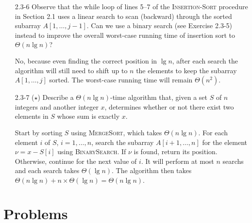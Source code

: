 \begin{enumerate}
\item[2.3{-}6]{Observe that the while loop of lines 5{--}7 of the
\textsc{Insertion-Sort} procedure in Section 2.1 uses a linear search to scan
(backward) through the sorted subarray $A[1, \dots, j - 1]$. Can we use a binary
search (see Exercise 2.3-5) instead to improve the overall worst-case running
time of insertion sort to $\Theta(n \lg n)$?}

\begin{framed}
No, because even finding the correct position in $\lg n$, after each search the
algorithm will still need to shift up to $n$ the elements to keep the subarray
$A[1, \dots, j]$ sorted. The worst-case running time will remain $\Theta(n^2)$.
\end{framed}

\item[2.3{-}7]{($\star$) Describe a $\Theta(n \lg n)$-time algorithm that, given a set
$S$ of $n$ integers and another integer $x$, determines whether or not there
exist two elements in $S$ whose sum is exactly $x$.}

\begin{framed}
Start by sorting $S$ using \textsc{MergeSort}, which takes $\Theta(n \lg n)$.
For each element $i$ of $S$, $i = 1, \dots, n$, search the subarray $A[i + 1,
\dots, n]$ for the element $\nu = x - S[i]$ using \textsc{BinarySearch}. If
$\nu$ is found, return its position. Otherwise, continue for the next value of
$i$. It will perform at most $n$ searchs and each search takes $\Theta(\lg n)$.
The algorithm then takes $\Theta(n \lg n) + n \times \Theta(\lg n) = \Theta(n
\lg n)$.
\end{framed}

\end{enumerate}

\pagebreak

\section*{Problems}
%

